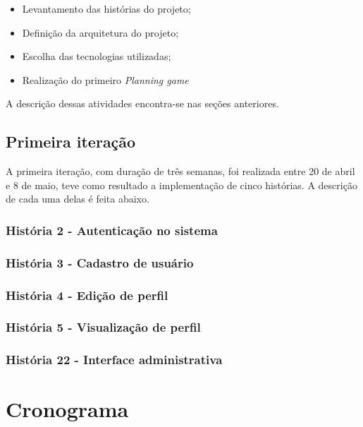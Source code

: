 \documentclass[a4paper,12pt,font=plain,header=plain]{abnt}
\begin{document}
    \begin{itemize}
      \item
        Levantamento das histórias do projeto;
      \item
        Definição da arquitetura do projeto;
      \item
        Escolha das tecnologias utilizadas;
      \item
        Realização do primeiro \textit{Planning game}
    \end{itemize}

  A descrição dessas atividades encontra-se nas seções anteriores.

  \section{Primeira iteração}
    A primeira iteração, com duração de três semanas, foi realizada entre 20 de abril e 8 de maio, teve como resultado a implementação de cinco histórias. A descrição de cada uma delas é feita abaixo.

    \subsection{História 2 - Autenticação no sistema}
    \subsection{História 3 - Cadastro de usuário}
    \subsection{História 4 - Edição de perfil}
    \subsection{História 5 - Visualização de perfil}
    \subsection{História 22 - Interface administrativa}

\chapter{Cronograma}
\end{document}

